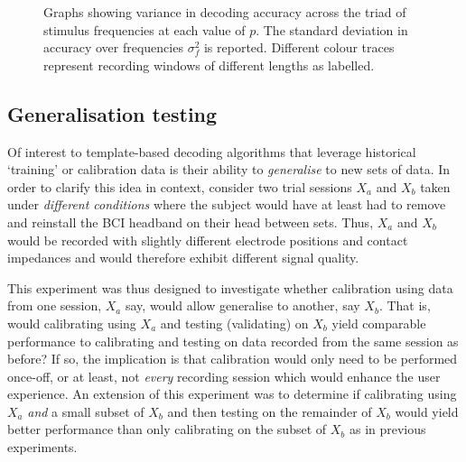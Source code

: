 \begin{figure}[h]
\hfill
{}
\caption[Graphs showing variance in decoding accuracy across the triad of stimulus frequencies at each value of $p$.]{Graphs showing variance in decoding accuracy across the triad of stimulus frequencies at each value of $p$. The standard deviation in accuracy over frequencies $\sigma_f^2$ is reported. Different colour traces represent recording windows of different lengths as labelled.}
\label{fig:freq-var-plots}
\end{figure}


\subsection{Generalisation testing}
\label{subsection:generalisation-testing}
Of interest to template-based decoding algorithms that leverage historical `training' or calibration data is their ability to \textit{generalise} to new sets of data. In order to clarify this idea in context, consider two trial sessions $X_a$ and $X_b$ taken under \textit{different conditions} where the subject would have at least had to remove and reinstall the BCI headband on their head between sets. Thus, $X_a$ and $X_b$ would be recorded with slightly different electrode positions and contact impedances and would therefore exhibit different signal quality. 

This experiment was thus designed to investigate whether calibration using data from one session, $X_a$ say, would allow generalise to another, say $X_b$. That is, would calibrating using $X_a$ and testing (validating) on $X_b$ yield comparable performance to calibrating and testing on data recorded from the same session as before? If so, the implication is that calibration would only need to be performed once-off, or at least, not \textit{every} recording session which would enhance the user experience. An extension of this experiment was to determine if calibrating using $X_a$ \textit{and} a small subset of $X_b$ and then testing on the remainder of $X_b$ would yield better performance than only calibrating on the subset of $X_b$ as in previous experiments.

